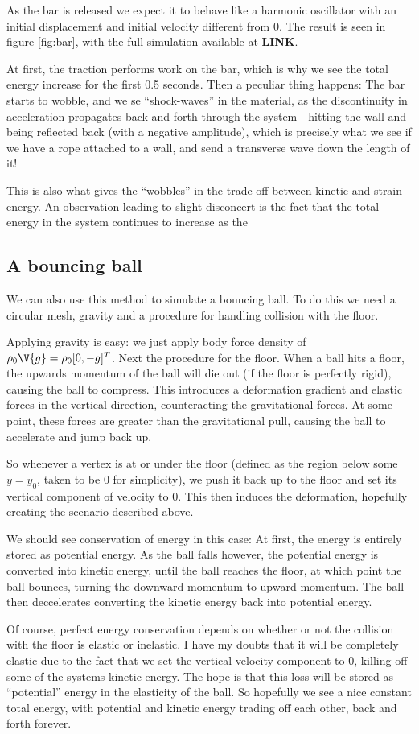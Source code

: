\documentclass[sigconf]{acmart}
\begin{document}
As the bar is released we expect it to behave like a harmonic oscillator with an initial displacement and initial velocity different from 0. The result is seen in figure \ref{fig:bar}, with the full simulation available at \textbf{LINK}.

At first, the traction performs work on the bar, which is why we see the total energy increase for the first 0.5 seconds. Then a peculiar thing happens: The bar starts to wobble, and we se ``shock-waves'' in the material, as the discontinuity in acceleration propagates back and forth through the system - hitting the wall and being reflected back (with a negative amplitude), which is precisely what we see if we have a rope attached to a wall, and send a transverse wave down the length of it!

This is also what gives the ``wobbles'' in the trade-off between kinetic and strain energy. An observation leading to slight disconcert is the fact that the total energy in the system continues to increase as the 


\subsection{A bouncing ball}
We can also use this method to simulate a bouncing ball. To do this we need a circular mesh, gravity and a procedure for handling collision with the floor.

Applying gravity is easy: we just apply body force density of $ \rho_0\V{g}=\rho_0[0, -g]^T $. Next the procedure for the floor. When a ball hits a floor, the upwards momentum of the ball will die out (if the floor is perfectly rigid), causing the ball to compress. This introduces a deformation gradient and elastic forces in the vertical direction, counteracting the gravitational forces. At some point, these forces are greater than the gravitational pull, causing the ball to accelerate and jump back up.

So whenever a vertex is at or under the floor (defined as the region below some $ y=y_0 $, taken to be $ 0 $ for simplicity), we push it back up to the floor and set its vertical component of velocity to 0. This then induces the deformation, hopefully creating the scenario described above.

We should see conservation of energy in this case: At first, the energy is entirely stored as potential energy. As the ball falls however, the potential energy is converted into kinetic energy, until the ball reaches the floor, at which point the ball bounces, turning the downward momentum to upward momentum. The ball then deccelerates converting the kinetic energy back into potential energy.

Of course, perfect energy conservation depends on whether or not the collision with the floor is elastic or inelastic. I have my doubts that it will be completely elastic due to the fact that we set the vertical velocity component to 0, killing off some of the systems kinetic energy. The hope is that this loss will be stored as ``potential'' energy in the elasticity of the ball. So hopefully we see a nice constant total energy, with potential and kinetic energy trading off each other, back and forth forever.
\end{document}
